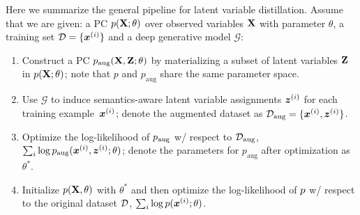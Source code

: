 \documentclass{article} %
\begin{document}
 Here we summarize the general pipeline for latent variable distillation. Assume that we are given: a PC $p(\mathbf{X}; \theta)$ over observed variables $\mathbf{X}$ with parameter $\theta$, a training set $\mathcal{D} = \{\boldsymbol{x}^{(i)}\}$ and a deep generative model $\mathcal{G}$:
\begin{enumerate}
    \item Construct a PC $p_{\text{aug}}(\mathbf{X}, \mathbf{Z}; \theta)$ by materializing a subset of latent variables $\mathbf{Z}$ in $p(\mathbf{X}; \theta)$; note that $p$ and $p_{\text{aug}}$ share the same parameter space.
    \item Use $\mathcal{G}$ to induce semantics-aware latent variable assignments $\boldsymbol{z}^{(i)}$ for each training example~$\boldsymbol{x}^{(i)}$; denote the augmented dataset as $\mathcal{D}_{\text{aug}}=\{\boldsymbol{x}^{(i)}, \boldsymbol{z}^{(i)}\}$.
    \item Optimize the log-likelihood of ${p}_{\text{aug}}$ w/ respect to $\mathcal{D}_{\text{aug}}$, \ie $\sum_{i} \log p_{\text{aug}}(\boldsymbol{x}^{(i)}, \boldsymbol{z}^{(i)}; \theta)$; denote the parameters for $p_{\text{aug}}$ after optimization as $\theta^{*}$.
    \item Initialize ${p}(\mathbf{X}, \theta)$ with $\theta^{*}$ and then optimize the log-likelihood of ${p}$ w/ respect to the original dataset $\mathcal{D}$, \ie $\sum_{i} \log p(\boldsymbol{x}^{(i)}; \theta)$.
\end{enumerate}


\end{document}
